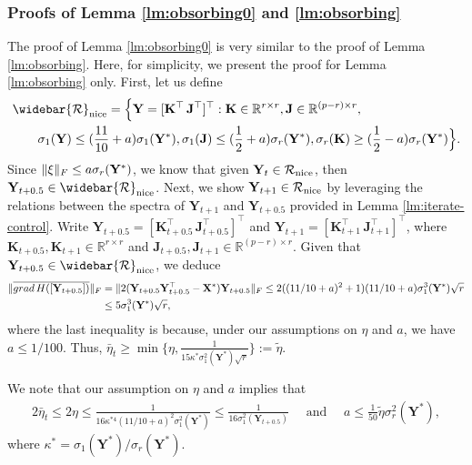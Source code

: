 \documentclass[11pt]{article}
\newcommand{\bbR}{\mathbb{R}}
\newcommand{\0}{{\mathbf{0}}}
\newcommand{\1}{{\mathbf{1}}}
\newcommand{\X}{{\mathbf{X}}}
\newcommand{\K}{{\mathbf{K}}}
\newcommand{\J}{{\mathbf{J}}}
\newcommand{\Y}{{\mathbf{Y}}}
\newcommand{\cR}{{\cal R}}
\newcommand{\grad}{{\rm grad}}
\newcommand{\F}{{\rm F}}
\begin{document}
{\subsubsection{Proofs of Lemma \ref{lm:obsorbing0} and \ref{lm:obsorbing} }
\label{sec:AdditionalLemmas}
The proof of Lemma \ref{lm:obsorbing0} is very similar to the proof of Lemma \ref{lm:obsorbing}. Here, for simplicity, we present the proof for Lemma \ref{lm:obsorbing} only. First, let us define 
\begin{equation*}
	\begin{split}
		&\widebar{\cR}_{\text{nice}} = \Big \{ \Y = [\K^\top \, \J^{\top}]^{\top}: \K \in \bbR^{r \times r}, \J \in \bbR^{(p-r) \times r}, \\ 
		& \quad \quad \sigma_1(\Y) \leq (\frac{11}{10}+a) \sigma_1(\Y^*), \sigma_1(\J) \leq (\frac{1}{2} + a) \sigma_r(\Y^*), \sigma_r(\K) \geq (\frac{1}{2}-a) \sigma_r(\Y^*) \Big \}.
	\end{split}
\end{equation*} Since $\|\xi\|_\F \leq a \sigma_r(\Y^*)$, we know that given $\Y_t \in \cR_{\text{nice}}$, then $\Y_{t+0.5} \in \widebar{\cR}_{\text{nice}}$. Next, we show ${\Y}_{t+1} \in \cR_{\text{nice}}$ by leveraging the relations between the spectra of ${\Y}_{t+1}$ and $\Y_{t+0.5}$ provided in Lemma \ref{lm:iterate-control}. Write $\Y_{t+0.5} = [\K_{t+0.5}^\top \, \J_{t+0.5}^{\top}]^{\top}$ and $\Y_{t+1} = [\K_{t+1}^\top \, \J_{t+1}^{\top}]^{\top}$, where $\K_{t+0.5}, \K_{t+1} \in \bbR^{r \times r}$ and $ \J_{t+0.5}, \J_{t+1}  \in \bbR^{(p-r) \times r}$. Given that $\Y_{t+0.5} \in \widebar{\cR}_{\text{nice}}$, we deduce
\begin{equation*}
	\begin{split}
		\|\overline{\grad\, H([\Y_{t+0.5}])}\|_{\F} &= \|2(\Y_{t+0.5} \Y_{t+0.5}^\top - \X^*) \Y_{t+0.5}\|_{\F} \leq 2((11/10+a)^2 + 1 )(11/10+a)\sigma_1^3(\Y^*) \sqrt{r} \\
		& \leq 5 \sigma_1^3(\Y^*) \sqrt{r},
	\end{split}
\end{equation*} where the last inequality is because, under our assumptions on $\eta$ and $a$, we have $a \leq 1/100$. Thus, $\bar{\eta}_t \geq \min \{ \eta, \frac{1}{15 \kappa^* \sigma^2_1(\Y^*) \sqrt{r} }\}:= \tilde{\eta}$.


We note that our assumption on $\eta$ and $a$ implies that 
\begin{equation} \label{eq:eta-a-condition}
	\begin{split}
		2\bar{\eta}_t \leq 2\eta \leq \frac{1}{16 \kappa^{*4}  (11/10 +a)^2 \sigma^2_1(\Y^*)} \leq \frac{1}{16 \sigma^2_1(\Y_{t+0.5})} \quad \text{ and }\quad a \leq \frac{1}{50} \tilde{\eta} \sigma_r^2(\Y^*),
	\end{split}
\end{equation} where $\kappa^* = \sigma_1(\Y^*)/\sigma_r(\Y^*)$.

}
\end{document}
